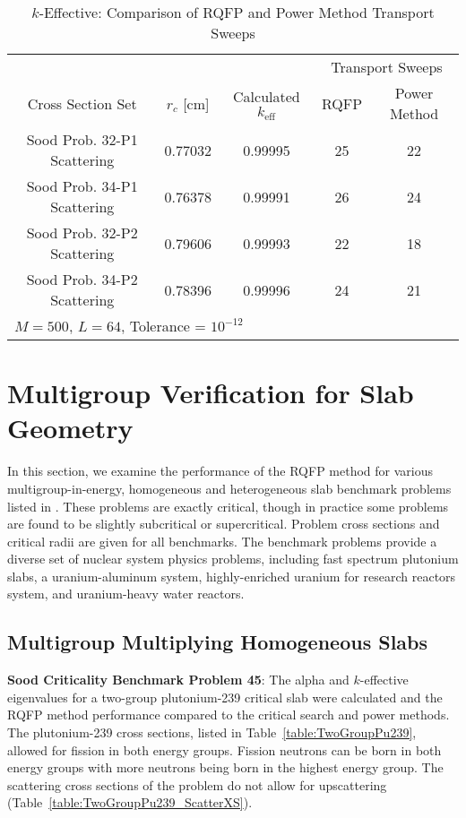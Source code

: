 \begin{table}[!htbp]
\begin{subtable}[!htbp]{1.0\textwidth}
\begin{tabular}{@{}ccccc@{}}
	& & & \multicolumn{2}{c}{Transport Sweeps} \\
	\cmidrule{4-5} Cross Section Set & $r_{c}$ [cm] & Calculated $k_{\text{eff}}$ & RQFP & Power Method\\
	\midrule
	Sood Prob. 32-P1 Scattering & 0.77032 & 0.99995 & 25 & 22 \\
	Sood Prob. 34-P1 Scattering & 0.76378 & 0.99991 & 26 & 24 \\
	Sood Prob. 32-P2 Scattering & 0.79606 & 0.99993 & 22 & 18 \\
	Sood Prob. 34-P2 Scattering & 0.78396 & 0.99996 & 24 & 21 \\
	\bottomrule%
	\multicolumn{5}{l}{$M = 500$, $L = 64$, Tolerance = $10^{-12}$} \\
	\end{tabular}
	\caption{$k$-Effective: Comparison of RQFP and Power Method Transport Sweeps}
	\label{table:CompAnisoSweepk}
	\end{subtable}
\end{table}

\clearpage
\section{Multigroup Verification for Slab Geometry}

In this section, we examine the performance of the RQFP method for various multigroup-in-energy, homogeneous and heterogeneous slab benchmark problems listed in \cite{sood2003analytical}. These problems are exactly critical, though in practice some problems are found to be slightly subcritical or supercritical. Problem cross sections and critical radii are given for all benchmarks. The benchmark problems provide a diverse set of nuclear system physics problems, including fast spectrum plutonium slabs, a uranium-aluminum system, highly-enriched uranium for research reactors system, and uranium-heavy water reactors.

\subsection{Multigroup Multiplying Homogeneous Slabs}
\label{sec:MGMultSlabs}

\textbf{Sood Criticality Benchmark Problem 45}: The alpha and $k$-effective eigenvalues for a two-group plutonium-239 critical slab were calculated and the RQFP method performance compared to the critical search and power methods. The plutonium-239 cross sections, listed in Table~\ref{table:TwoGroupPu239}, allowed for fission in both energy groups. Fission neutrons can be born in both energy groups with more neutrons being born in the highest energy group. The scattering cross sections of the problem do not allow for upscattering (Table~\ref{table:TwoGroupPu239_ScatterXS}).

